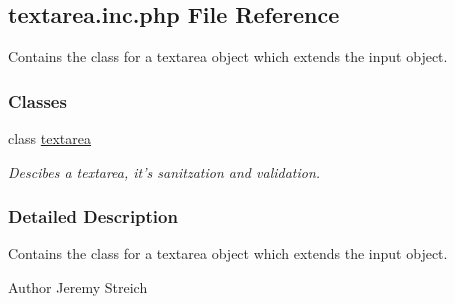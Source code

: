 \hypertarget{textarea_8inc_8php}{\subsection{textarea.\-inc.\-php File Reference}
\label{textarea_8inc_8php}
}


Contains the class for a textarea object which extends the input object.  


\subsubsection*{Classes}
\begin{DoxyCompactItemize}
\item 
class \hyperlink{classtextarea}{textarea}
\begin{DoxyCompactList}\small\item\em Descibes a textarea, it's sanitzation and validation. \end{DoxyCompactList}\end{DoxyCompactItemize}


\subsubsection{Detailed Description}
Contains the class for a textarea object which extends the input object. \begin{DoxyAuthor}{Author}
Jeremy Streich 
\end{DoxyAuthor}
